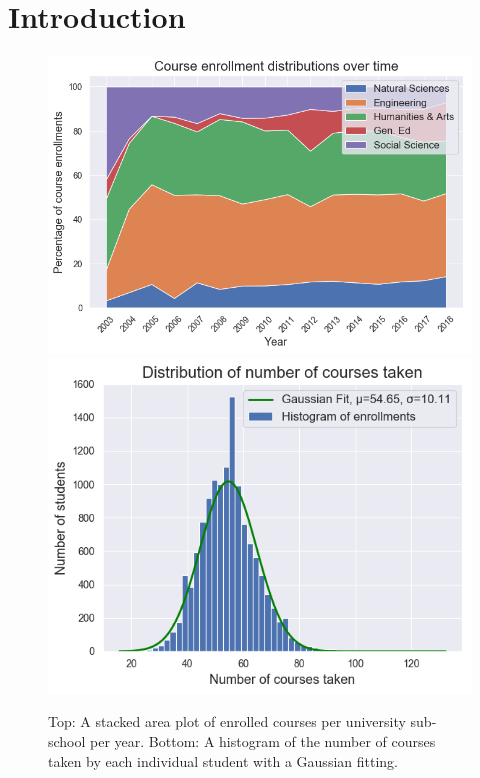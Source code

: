 \documentclass{edm_template}
\begin{document}
%


\section{Introduction}

\begin{figure}
    \centering
    \includegraphics[scale=0.48]{figures/dists_over_time.png}
    \includegraphics[scale=0.51]{figures/enrollment_dist.png}
    \caption{Top: A stacked area plot of enrolled courses per university sub-school per year. Bottom: A histogram of the number of courses taken by each individual student with a Gaussian fitting.}
    \label{fig:data_statistics}
\end{figure}
\end{document}
